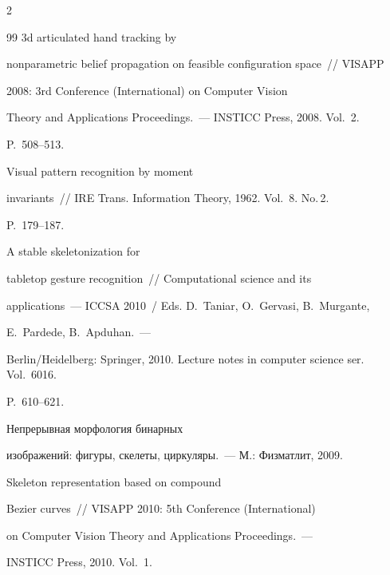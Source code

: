 \begin{multicols}{2}
{{\begin{thebibliography}{99}
 3d articulated hand tracking by


  nonparametric belief propagation on feasible configuration space~// VISAPP


  2008:  3rd  Conference (International) on Computer Vision


  Theory and Applications Proceedings.~---  INSTICC Press, 2008.  Vol.~2.


P.~508--513.







 Visual pattern recognition by moment


  invariants~// IRE Trans. Information Theory, 1962. Vol.~8. No.\,2.


P.~179--187.







 A stable skeletonization for


  tabletop gesture recognition~// Computational science and its


  applications~--- ICCSA 2010~/ Eds. D.~Taniar, O.~Gervasi, B.~Murgante,


  E.~Pardede, B.~Apduhan.~---


 Berlin/Heidelberg: Springer, 2010.   Lecture notes in computer science ser. Vol.~6016.


P.~610--621.







 Непрерывная морфология бинарных


  изображений: фигуры, скелеты, циркуляры.~--- М.: Физматлит, 2009.







 Skeleton representation based on compound


  Bezier curves~// VISAPP 2010:  5th Conference (International)


  on Computer Vision Theory and Applications Proceedings.~---


 INSTICC Press, 2010.  Vol.~1. 


 



\end{thebibliography}}}
\end{multicols}
